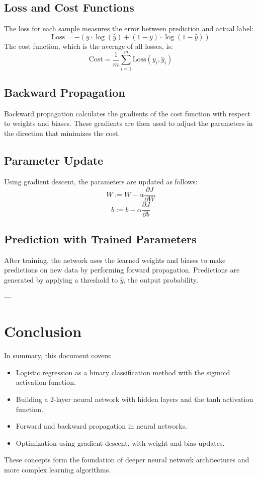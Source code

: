 \documentclass{article}
\begin{document}
\subsection{Loss and Cost Functions}
The loss for each sample measures the error between prediction and actual label:
\[
\text{Loss} = - \left( y \cdot \log(\hat{y}) + (1 - y) \cdot \log(1 - \hat{y}) \right)
\]
The cost function, which is the average of all losses, is:
\[
\text{Cost} = \frac{1}{m} \sum_{i=1}^{m} \text{Loss}(y_i, \hat{y}_i)
\]

\subsection{Backward Propagation}
Backward propagation calculates the gradients of the cost function with respect to weights and biases. These gradients are then used to adjust the parameters in the direction that minimizes the cost.

\subsection{Parameter Update}
Using gradient descent, the parameters are updated as follows:
\[
W := W - \alpha \frac{\partial J}{\partial W}
\]
\[
b := b - \alpha \frac{\partial J}{\partial b}
\]

\subsection{Prediction with Trained Parameters}
After training, the network uses the learned weights and biases to make predictions on new data by performing forward propagation. Predictions are generated by applying a threshold to $\hat{y}$, the output probability.

---

\section{Conclusion}
In summary, this document covers:
\begin{itemize}
    \item Logistic regression as a binary classification method with the sigmoid activation function.
    \item Building a 2-layer neural network with hidden layers and the tanh activation function.
    \item Forward and backward propagation in neural networks.
    \item Optimization using gradient descent, with weight and bias updates.
\end{itemize}
These concepts form the foundation of deeper neural network architectures and more complex learning algorithms.
\end{document}
